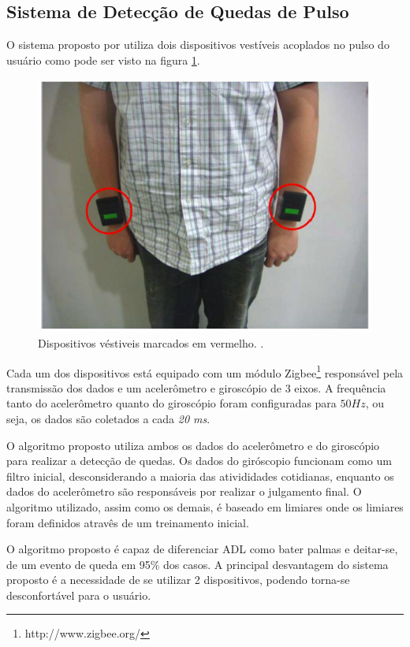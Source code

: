 \subsection{Sistema de Detecção de Quedas de Pulso}
O sistema proposto por \cite{hsieh2014wrist} utiliza dois dispositivos vestíveis acoplados no pulso do usuário como pode ser visto na figura \ref{fig:wrist_worn}. 


\begin{figure}[ht]
	\centering
	\includegraphics[scale=0.4]{imagens/wrist_worn.png}
	\caption{ Dispositivos véstiveis marcados em vermelho. \cite{hsieh2014wrist}.}
	\label{fig:wrist_worn}
\end{figure} 


Cada um dos dispositivos está equipado com um módulo Zigbee\footnote{http://www.zigbee.org/} responsável pela transmissão dos dados e  um acelerômetro e  giroscópio de 3 eixos. A frequência tanto do acelerômetro quanto do giroscópio foram configuradas para $50 Hz$, ou seja, os dados são coletados a cada \textit{20 ms}.


O algoritmo proposto utiliza ambos os dados do acelerômetro e do giroscópio para realizar a detecção de quedas. Os dados do giróscopio funcionam como um filtro inicial, desconsiderando a maioria das ativididades cotidianas, enquanto os dados do acelerômetro são responsáveis por realizar o julgamento final. O algoritmo utilizado, assim como os demais, é baseado em limiares onde os limiares foram definidos atravês de um treinamento inicial. 

O algoritmo proposto é capaz de diferenciar \ac{ADL} como bater palmas e deitar-se, de um evento de queda em 95\% dos casos. A principal desvantagem do sistema proposto é a necessidade de se utilizar 2 dispositivos, podendo torna-se desconfortável para o usuário.







